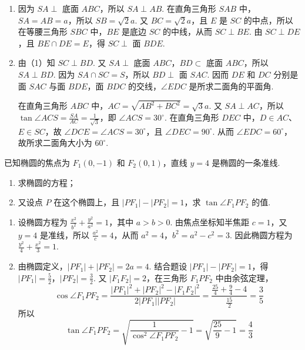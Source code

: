 \documentclass[UTF8,a4paper,oneside,11pt]{ctexbook}
\begin{document}
\begin{solution}
\begin{enumerate}
\item 因为 \(SA\perp\) 底面 \(ABC\)，所以 \(SA\perp AB\). 在直角三角形 \(SAB\) 中，\(SA=AB=a\)，所以 \(SB=\sqrt{2}a\). 又 \(BC=\sqrt{2}a\)，且 \(E\) 是 \(SC\) 的中点，所以在等腰三角形 \(SBC\) 中，\(BE\) 是底边 \(SC\) 的中线，从而 \(SC\perp BE\). 由 \(SC\perp DE\)，且 \(BE\cap DE=E\)，得 \(SC\perp\) 面 \(BDE\).

\item 由（1）知 \(SC\perp BD\). 又 \(SA\perp\) 底面 \(ABC\)，\(BD\subset\) 底面 \(ABC\)，所以 \(SA\perp BD\). 因为 \(SA\cap SC=S\)，所以 \(BD\perp\) 面 \(SAC\). 因而 \(DE\) 和 \(DC\) 分别是面 \(SAC\) 与面 \(BDE\)，面 \(BDC\) 的交线，\(\angle EDC\) 是所求二面角的平面角.

在直角三角形 \(ABC\) 中，\(AC=\sqrt{AB^2+BC^2}=\sqrt{3}a\). 又 \(SA\perp AC\)，所以 \(\tan\angle ACS=\frac{SA}{AC}=\frac{1}{\sqrt{3}}\)，即 \(\angle ACS=30^{\circ}\). 在直角三角形 \(DEC\) 中，\(D\in AC\)、\(E\in SC\)，故 \(\angle DCE=\angle ACS=30^{\circ}\)，且 \(\angle DEC=90^{\circ}\). 从而 \(\angle EDC=60^{\circ}\)，故所求二面角大小为 \(60^{\circ}\).
\end{enumerate}
\end{solution}

\begin{problem}
已知椭圆的焦点为 \(F_1(0,-1)\) 和 \(F_2(0,1)\)，直线 \(y=4\) 是椭圆的一条准线.
\begin{enumerate}
\item 求椭圆的方程；
\item 又设点 \(P\) 在这个椭圆上，且 \(\left| PF_1 \right|-\left| PF_2 \right|=1\)，求 \(\tan\angle F_1PF_2\) 的值.
\end{enumerate}
\end{problem}

\begin{solution}
\begin{enumerate}
\item 设椭圆方程为 \(\frac{x^2}{b^2}+\frac{y^2}{a^2}=1\)，其中 \(a>b>0\). 由焦点坐标知半焦距 \(c=1\)，又 \(y=4\) 是准线，所以 \(\frac{a^2}{c}=4\)，从而 \(a^2=4\)，\(b^2=a^2-c^2=3\). 因此椭圆方程为 \(\frac{y^2}{4}+\frac{x^2}{3}=1\).

\item 由椭圆定义，\(\left|PF_1\right|+\left|PF_2\right|=2a=4\). 结合题设 \(\left|PF_1\right|-\left|PF_2\right|=1\)，得 \(\left|PF_1\right|=\frac{5}{2}\)，\(\left|PF_2\right|=\frac{3}{2}\). 又 \(\left|F_1F_2\right|=2\)，在三角形 \(F_1PF_2\) 中由余弦定理，
\[
\cos\angle F_1PF_2
=\frac{\left|PF_1\right|^2+\left|PF_2\right|^2-\left|F_1F_2\right|^2}{2\left|PF_1\right|\left|PF_2\right|}
=\frac{\frac{25}{4}+\frac{9}{4}-4}{\frac{15}{2}}
=\frac{3}{5}
\]
所以
\[
\tan\angle F_1PF_2
 =\sqrt{\frac{1}{\cos^2\angle F_1PF_2}-1}
 =\sqrt{\frac{25}{9}-1}
 =\frac{4}{3}
\]
\end{enumerate}
\end{solution}
\end{document}
